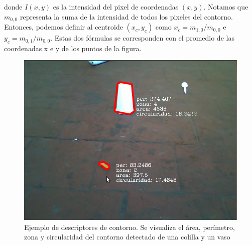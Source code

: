	donde $I(x,y)$ es la intensidad del pixel de coordenadas $(x,y)$.
	Notamos que $m_{0,0}$ representa la suma de la intensidad de todos los pixeles del 
	contorno. Entonces, podemos definir al centroide $(x_c,y_c)$ como 
	$x_c= m_{1,0} / m_{0,0}$ e 
	$y_c=m_{0,1} / m_{0,0}$. Estas dos fórmulas se corresponden con el 
	promedio de las coordenadas x e y de los puntos de la figura.  


\begin{figure}[tpb]
\begin{center}
  \includegraphics[scale=0.4]{figuras/filtros.png}
\end{center}
  \caption{\small Ejemplo de descriptores de contorno. Se visualiza el área, perímetro, zona y circularidad del contorno 
  detectado de una colilla y un vaso}
  \label{fig:erode}
\end{figure}


